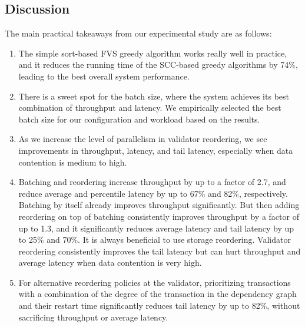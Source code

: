 






\subsection{Discussion}

The main practical takeaways from our experimental study are as follows:
\vspace{-.5em}
\begin{enumerate}[leftmargin=*]
\item The simple sort-based FVS greedy algorithm works really well in practice, and it reduces the running time of the SCC-based greedy algorithms by 74\%, leading to the best overall system performance. 
\item There is a sweet spot for the batch size, where the system achieves its best combination of throughput and latency. We empirically selected the best batch size for our configuration and workload based on the results.
\item As we increase the level of parallelism in validator reordering, we see improvements in throughput, latency, and tail latency, especially when data contention is medium to high.
\item Batching and reordering increase throughput by up to a factor of 2.7, and reduce average and percentile latency by up to 67\% and 82\%, respectively.
Batching by itself already improves throughput significantly. But then adding reordering on top of batching consistently improves throughput by a factor of up to 1.3, and it significantly reduces average latency and tail latency by up to 25\% and 70\%. It is always beneficial to use storage reordering. Validator reordering consistently improves the tail latency but can hurt throughput and average latency when data contention is very high.
\item For alternative reordering policies at the validator, prioritizing transactions with a combination of the degree of the transaction in the dependency graph and their restart time significantly reduces tail latency by up to 82\%, without sacrificing throughput or average latency.

\end{enumerate}
